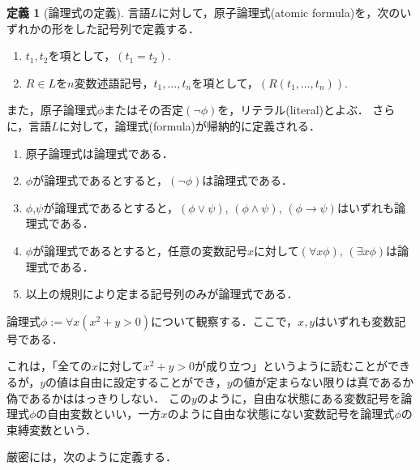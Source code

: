 \documentclass[uplatex, dvipdfmx]{jsarticle}
\theoremstyle{definition}
\newtheorem{definition}{定義}[section]
\begin{document}
\begin{definition}[論理式の定義]
     言語$L$に対して，原子論理式(atomic formula)を，次のいずれかの形をした記号列で定義する．
     \begin{enumerate}
          \item $t_1, t_2$を項として，$(t_1=t_2)$.
          \item $R \in L$を$n$変数述語記号，$t_1, \dots, t_n$を項として，$(R(t_1, \dots, t_n))$.
     \end{enumerate}
     
     また，原子論理式$\phi$またはその否定$(\lnot \phi)$を，リテラル(literal)とよぶ．
     さらに，言語$L$に対して，論理式(formula)が帰納的に定義される．
     \begin{enumerate}
          \item 原子論理式は論理式である．
          \item $\phi$が論理式であるとすると，$(\lnot \phi)$は論理式である．
          \item $\phi$,$\psi$が論理式であるとすると，$(\phi \lor \psi)$, $(\phi \land \psi)$, $(\phi \rightarrow \psi)$はいずれも論理式である．
          \item $\phi$が論理式であるとすると，任意の変数記号$x$に対して$(\forall x \phi)$, $(\exists x \phi)$は論理式である．
          \item 以上の規則により定まる記号列のみが論理式である．
     \end{enumerate}
\end{definition}

論理式$\phi := \forall x (x^2 + y > 0)$について観察する．ここで，$x,y$はいずれも変数記号である．

これは，「全ての$x$に対して$x^2 + y > 0$が成り立つ」というように読むことができるが，$y$の値は自由に設定することができ，$y$の値が定まらない限りは真であるか偽であるかははっきりしない．
この$y$のように，自由な状態にある変数記号を論理式$\phi$の自由変数といい，一方$x$のように自由な状態にない変数記号を論理式$\phi$の束縛変数という．

厳密には，次のように定義する．
\end{document}
